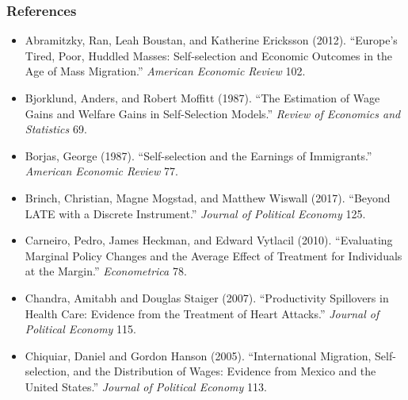 \documentclass[blue]{beamer}
\begin{document}
{{\frametitle{References}
\begin{itemize}
\item {\scriptsize Abramitzky, Ran, Leah Boustan, and Katherine Ericksson
(2012). ``Europe's Tired, Poor, Huddled Masses: Self-selection and
Economic Outcomes in the Age of Mass Migration.'' }{\scriptsize\emph{American
Economic Review }}{\scriptsize 102.}{\scriptsize\par}
\item {\scriptsize Bjorklund, Anders, and Robert Moffitt (1987). ``The Estimation
of Wage Gains and Welfare Gains in Self-Selection Models.'' }{\scriptsize\emph{Review
of Economics and Statistics }}{\scriptsize 69.}{\scriptsize\par}
\item {\scriptsize Borjas, George (1987). ``Self-selection and the Earnings
of Immigrants.'' }{\scriptsize\emph{American Economic Review }}{\scriptsize 77.}{\scriptsize\par}
\item {\scriptsize Brinch, Christian, Magne Mogstad, and Matthew Wiswall
(2017). ``Beyond LATE with a Discrete Instrument.'' }{\scriptsize\emph{Journal
of Political Economy }}{\scriptsize 125.}{\scriptsize\par}
\item {\scriptsize Carneiro, Pedro, James Heckman, and Edward Vytlacil (2010).
``Evaluating Marginal Policy Changes and the Average Effect of Treatment
for Individuals at the Margin.'' }{\scriptsize\emph{Econometrica
}}{\scriptsize 78.}{\scriptsize\par}
\item {\scriptsize Chandra, Amitabh and Douglas Staiger (2007). \textquotedblleft Productivity
Spillovers in Health Care: Evidence from the Treatment of Heart Attacks.\textquotedblright{}
}{\scriptsize\textit{Journal of Political Economy}}{\scriptsize{} 115.}{\scriptsize\par}
\item {\scriptsize Chiquiar, Daniel and Gordon Hanson (2005). ``International
Migration, Self-selection, and the Distribution of Wages: Evidence
from Mexico and the United States.'' }{\scriptsize\emph{Journal of
Political Economy }}{\scriptsize 113.}{\scriptsize\par}
\end{itemize}
}

\frame{ 

}}
\end{document}
